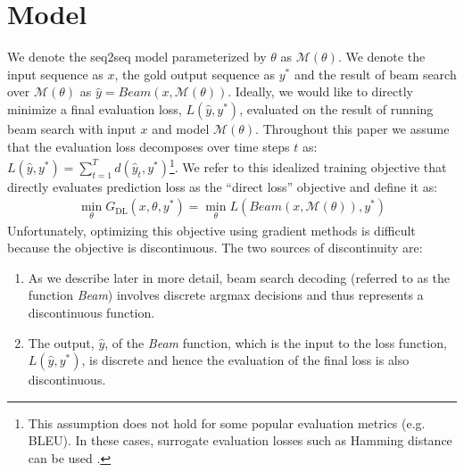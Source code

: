 \documentclass[letterpaper]{article} %
\begin{document}

\section{Model}

We denote the seq2seq model parameterized by $\theta$ as $\mathcal{M}(\theta)$. We denote the input sequence as $x$, the gold output sequence as $y^*$ and the result of beam search over $\mathcal{M}(\theta)$ as $\hat{y} = \textit{Beam}(x,\mathcal{M}(\theta))$. Ideally, we would like to directly minimize a final evaluation loss, $L(\hat{y},y^*)$, evaluated on the result of running beam search with input $x$ and model $\mathcal{M}(\theta)$. Throughout this paper we assume that the evaluation loss decomposes over time steps $t$ as: $L(\hat{y},y^*)=\sum_{t=1}^T d(\hat{y}_t,y^*)$\footnote{This assumption does not hold  for some popular evaluation metrics (e.g. BLEU). In these cases, surrogate evaluation losses such as Hamming distance can be used
.}. 
We refer to this idealized training objective that directly evaluates prediction loss as the ``direct loss'' objective and define it as:
\begin{align}
\min_{\theta} G_{\textrm{DL}}(x,\theta,y^*) = \min_{\theta} L(\textit{Beam}(x,\mathcal{M}(\theta)),y^*)
\end{align}
Unfortunately, optimizing this objective using gradient methods is difficult because the objective is discontinuous. The two sources of discontinuity are:
\begin{enumerate}
\item As we describe later in more detail, beam search decoding (referred to as the function \textit{Beam}) involves discrete argmax decisions and thus represents a discontinuous function.
\item The output, $\hat{y}$, of the \textit{Beam} function, which is the input to the loss function, $L(\hat{y},y^*)$, is discrete and hence the evaluation of the final loss is also discontinuous.
\end{enumerate}
\end{document}
